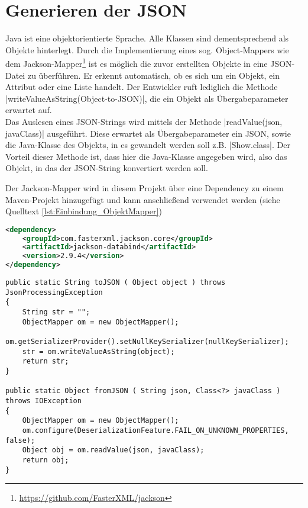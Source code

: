 \section{Generieren der \acf{JSON}}
\label{sec:json_generieren}

Java ist eine objektorientierte Sprache.
Alle Klassen sind dementsprechend als Objekte hinterlegt.
Durch die Implementierung eines sog. Object-Mappers wie dem Jackson-Mapper\footnote{\url{https://github.com/FasterXML/jackson}}
ist es möglich die zuvor erstellten Objekte in eine \acs{JSON}-Datei zu überführen.
Er erkennt automatisch, ob es sich um ein Objekt, ein Attribut oder eine Liste handelt.
Der Entwickler ruft lediglich die Methode \jinline |writeValueAsString(Object-to-JSON)|, die ein Objekt als Übergabeparameter erwartet auf. \\
Das Auslesen eines \acs{JSON}-Strings wird mittels der Methode \jinline |readValue(json, javaClass)| ausgeführt.
Diese erwartet als Übergabeparameter ein \acs{JSON}, sowie die Java-Klasse des Objekts, in es gewandelt werden soll z.B. \jinline |Show.class|.
Der Vorteil dieser Methode ist, dass hier die Java-Klasse angegeben wird, also das Objekt, in das der \acs{JSON}-String konvertiert werden soll.

Der Jackson-Mapper wird in diesem Projekt über eine Dependency zu einem Maven-Projekt hinzugefügt und kann anschließend verwendet werden (siehe Quelltext \ref{lst:Einbindung_ObjektMapper}) %

\begin{lstlisting}[language=XML, caption={Einbindung des Objekt-Mappers in die pom.xml}, label={lst:Einbindung_ObjektMapper}]
<dependency>
	<groupId>com.fasterxml.jackson.core</groupId>
	<artifactId>jackson-databind</artifactId>
	<version>2.9.4</version>
</dependency>
\end{lstlisting}

\begin{lstlisting}[style=lstJava, caption={Ausschnitt aus der selbst erstellten Klasse JSONConverter}]
public static String toJSON ( Object object ) throws JsonProcessingException
{
	String str = "";
	ObjectMapper om = new ObjectMapper();
	om.getSerializerProvider().setNullKeySerializer(nullKeySerializer);
	str = om.writeValueAsString(object);
	return str;
}

public static Object fromJSON ( String json, Class<?> javaClass ) throws IOException
{
	ObjectMapper om = new ObjectMapper();
	om.configure(DeserializationFeature.FAIL_ON_UNKNOWN_PROPERTIES, false);
	Object obj = om.readValue(json, javaClass);
	return obj;
}
\end{lstlisting}
